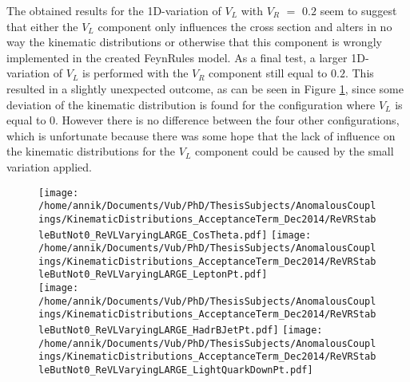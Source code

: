 The obtained results for the 1D-variation of $V_L$ with $V_R$ $=$ $0.2$ seem to suggest that either the $V_L$ component only influences the cross section and alters in no way the kinematic distributions or otherwise that this component is wrongly implemented in the created FeynRules model. 
As a final test, a larger 1D-variation of $V_L$ is performed with the $V_R$ component still equal to $0.2$. This resulted in a slightly unexpected outcome, as can be seen in Figure \ref{fig::KinChangeNot0LARGE}, since some deviation of the kinematic distribution is found for the configuration where $V_L$ is equal to $0$. However there is no difference between the four other configurations, which is unfortunate because there was some hope that the lack of influence on the kinematic distributions for the $V_L$ component could be caused by the small variation applied.
\begin{figure}[h]
 \centering
 \texttt{[image: /home/annik/Documents/Vub/PhD/ThesisSubjects/AnomalousCouplings/KinematicDistributions\_AcceptanceTerm\_Dec2014/ReVRStableButNot0\_ReVLVaryingLARGE\_CosTheta.pdf]}
 \texttt{[image: /home/annik/Documents/Vub/PhD/ThesisSubjects/AnomalousCouplings/KinematicDistributions\_AcceptanceTerm\_Dec2014/ReVRStableButNot0\_ReVLVaryingLARGE\_LeptonPt.pdf]}\\
 \texttt{[image: /home/annik/Documents/Vub/PhD/ThesisSubjects/AnomalousCouplings/KinematicDistributions\_AcceptanceTerm\_Dec2014/ReVRStableButNot0\_ReVLVaryingLARGE\_HadrBJetPt.pdf]}
 \texttt{[image: /home/annik/Documents/Vub/PhD/ThesisSubjects/AnomalousCouplings/KinematicDistributions\_AcceptanceTerm\_Dec2014/ReVRStableButNot0\_ReVLVaryingLARGE\_LightQuarkDownPt.pdf]}
 \caption{}
 \label{fig::KinChangeNot0LARGE}
\end{figure}

